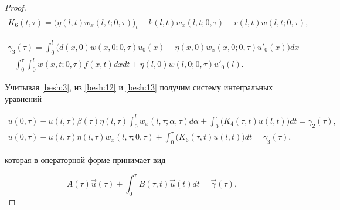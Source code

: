 \begin{proof}
\begin{gather*}
\\

K_{6}(t,\tau)=\big(\eta(l,t)w_{x}(l,t;0,\tau)\big)_{t}-

k(l,t)w_{x}(l,t;0,\tau)+r(l,t)w(l,t;0,\tau),

\end{gather*}

\begin{multline*}

\gamma_{3}(\tau)=\int^{l}_{0}\Big(d(x, 0)w(x, 0;0,\tau)u_{0}(x)-

\eta(x, 0)w_{x}(x, 0;0,\tau)u'_{0}(x)\Big)dx -

\\

-\int^{\tau}_0

\int^{l}_{0}w(x,t;0,\tau)f(x,t)dxdt+\eta(l, 0)w(l, 0;0,\tau)u'_{0}(l).

\end{multline*}



Учитывая \eqref{besh:3}, из \eqref{besh:12} и \eqref{besh:13} получим систему интегральных уравнений

\begin{multline}


u(0,\tau)-u(l,\tau)\beta(\tau)\eta(l,\tau)\int^{l}_{0}w_{x}(l,\tau;\alpha,\tau)d\alpha

+\int^{\tau}_0\Big(K_{4}(\tau,t)u(l,t)\Big)dt=\gamma_{2}(\tau),

\\

u(0,\tau)-u(l,\tau)\eta(l,\tau)w_{x}(l,\tau;0,\tau)

+\int^{\tau}_0\Big(K_{6}(\tau,t)u(l,t)\Big)dt=\gamma_{3}(\tau), ~~~~~~~


\label{besh:14}

\end{multline}

которая в операторной форме принимает вид

\begin{equation}

A(\tau)\overrightarrow{u}(\tau)+\int^{\tau}_0B(\tau,t)\overrightarrow{u}(t)

dt=\overrightarrow{\gamma}(\tau),

\label{besh:15}

\end{equation}


\end{proof}
